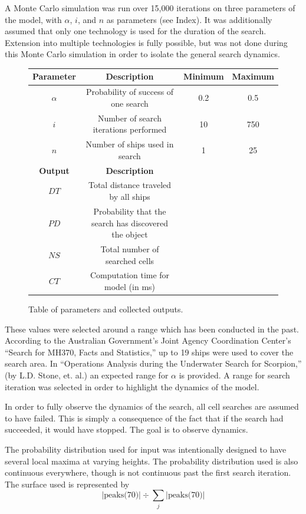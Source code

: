 \documentclass[a4paper]{article}
\begin{document}
A Monte Carlo simulation was run over 15,000 iterations on three parameters of the model, with $\alpha$, $i$, and $n$ as parameters (see Index). It was additionally assumed that only one technology is used for the duration of the search. Extension into multiple technologies is fully possible, but was not done during this Monte Carlo simulation in order to isolate the general search dynamics.

\begin{figure}[H]\begin{center}\begin{tabular}{|c|c|c|c|}
\hline \textbf{Parameter} & \textbf{Description} & \textbf{Minimum} & \textbf{Maximum}\\\hline\hline
$\alpha$ & Probability of success of one search & 0.2 & 0.5 \\\hline
$i$ & Number of search iterations performed & 10 & 750 \\\hline
$n$ & Number of ships used in search & 1 & 25 \\\hline\hline
\textbf{Output} & \textbf{Description} &&\\\hline
$DT$ & Total distance traveled by all ships &&\\\hline
$PD$ & Probability that the search has discovered the object &&\\\hline
$NS$ & Total number of searched cells &&\\\hline
$CT$ & Computation time for model (in ms) &&\\\hline
\end{tabular}\end{center}
\caption{Table of parameters and collected outputs.}
\end{figure}

These values were selected around a range which has been conducted in the past.  According to the Australian Government's Joint Agency Coordination Center's ``Search for MH370, Facts and Statistics,'' up to 19 ships were used to cover the search area. In ``Operations Analysis during the Underwater Search for Scorpion,'' (by L.D. Stone, et. al.) an expected range for $\alpha$ is provided.  A range for search iteration was selected in order to highlight the dynamics of the model.

In order to fully observe the dynamics of the search, all cell searches are assumed to have failed. This is simply a consequence of the fact that if the search had succeeded, it would have stopped. The goal is to observe dynamics.

The probability distribution used for input was intentionally designed to have several local maxima at varying heights. The probability distribution used is also continuous everywhere, though is not continuous past the first search iteration. The surface used is represented by $$|\mbox{peaks(70)}|\div \sum_j |\text{peaks(70)}|$$
\end{document}
